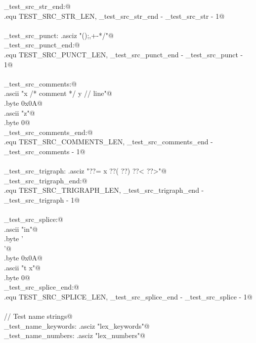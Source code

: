 \documentclass[11pt,a4paper,twoside,openright,DIV=15]{scrbook}
\theoremstyle{definition}
\theoremstyle{plain}
\theoremstyle{remark}
\begin{document}
\begin{flushleft}
\begin{minipage}{\linewidth}
\begin{list}{}{}
\mbox{}\verb@_test_src_str_end:@\\
\mbox{}\verb@.equ TEST_SRC_STR_LEN, _test_src_str_end - _test_src_str - 1@\\
\mbox{}\verb@@\\
\mbox{}\verb@_test_src_punct:    .asciz "(){};,+-*/"@\\
\mbox{}\verb@_test_src_punct_end:@\\
\mbox{}\verb@.equ TEST_SRC_PUNCT_LEN, _test_src_punct_end - _test_src_punct - 1@\\
\mbox{}\verb@@\\
\mbox{}\verb@_test_src_comments:@\\
\mbox{}\verb@    .ascii "x /* comment */ y // line"@\\
\mbox{}\verb@    .byte 0x0A@\\
\mbox{}\verb@    .ascii "z"@\\
\mbox{}\verb@    .byte 0@\\
\mbox{}\verb@_test_src_comments_end:@\\
\mbox{}\verb@.equ TEST_SRC_COMMENTS_LEN, _test_src_comments_end - _test_src_comments - 1@\\
\mbox{}\verb@@\\
\mbox{}\verb@_test_src_trigraph: .asciz "??= x ??( ??) ??< ??>"@\\
\mbox{}\verb@_test_src_trigraph_end:@\\
\mbox{}\verb@.equ TEST_SRC_TRIGRAPH_LEN, _test_src_trigraph_end - _test_src_trigraph - 1@\\
\mbox{}\verb@@\\
\mbox{}\verb@_test_src_splice:@\\
\mbox{}\verb@    .ascii "in"@\\
\mbox{}\verb@    .byte '\\'@\\
\mbox{}\verb@    .byte 0x0A@\\
\mbox{}\verb@    .ascii "t x"@\\
\mbox{}\verb@    .byte 0@\\
\mbox{}\verb@_test_src_splice_end:@\\
\mbox{}\verb@.equ TEST_SRC_SPLICE_LEN, _test_src_splice_end - _test_src_splice - 1@\\
\mbox{}\verb@@\\
\mbox{}\verb@// Test name strings@\\
\mbox{}\verb@_test_name_keywords:     .asciz "lex_keywords"@\\
\mbox{}\verb@_test_name_numbers:      .asciz "lex_numbers"@\\

\end{list}
\end{minipage}
\end{flushleft}
\end{document}
